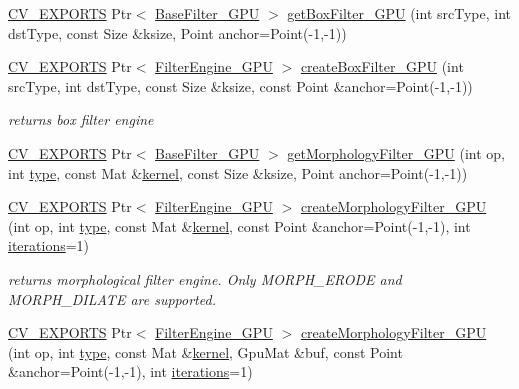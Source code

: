 \begin{DoxyCompactItemize}
\item 
\hyperlink{core_2types__c_8h_a1bf9f0e121b54272da02379cfccd0a2b}{C\-V\-\_\-\-E\-X\-P\-O\-R\-T\-S} Ptr$<$ \hyperlink{classcv_1_1gpu_1_1BaseFilter__GPU}{Base\-Filter\-\_\-\-G\-P\-U} $>$ \hyperlink{namespacecv_1_1gpu_a5dd82b8d8e9ff9dc81f109235651e16c}{get\-Box\-Filter\-\_\-\-G\-P\-U} (int src\-Type, int dst\-Type, const Size \&ksize, Point anchor=Point(-\/1,-\/1))
\item 
\hyperlink{core_2types__c_8h_a1bf9f0e121b54272da02379cfccd0a2b}{C\-V\-\_\-\-E\-X\-P\-O\-R\-T\-S} Ptr$<$ \hyperlink{classcv_1_1gpu_1_1FilterEngine__GPU}{Filter\-Engine\-\_\-\-G\-P\-U} $>$ \hyperlink{namespacecv_1_1gpu_a581d4a246334ad155cdb05b72d004365}{create\-Box\-Filter\-\_\-\-G\-P\-U} (int src\-Type, int dst\-Type, const Size \&ksize, const Point \&anchor=Point(-\/1,-\/1))
\begin{DoxyCompactList}\small\item\em returns box filter engine \end{DoxyCompactList}\item 
\hyperlink{core_2types__c_8h_a1bf9f0e121b54272da02379cfccd0a2b}{C\-V\-\_\-\-E\-X\-P\-O\-R\-T\-S} Ptr$<$ \hyperlink{classcv_1_1gpu_1_1BaseFilter__GPU}{Base\-Filter\-\_\-\-G\-P\-U} $>$ \hyperlink{namespacecv_1_1gpu_a61eac858fc4db7e2bb7adc16339e75a6}{get\-Morphology\-Filter\-\_\-\-G\-P\-U} (int op, int \hyperlink{imgproc__c_8h_a84612d8738bf935200cf32a103d8efe1}{type}, const Mat \&\hyperlink{imgproc__c_8h_a863a75780ba6c5de552f5361cb0d2c89}{kernel}, const Size \&ksize, Point anchor=Point(-\/1,-\/1))
\item 
\hyperlink{core_2types__c_8h_a1bf9f0e121b54272da02379cfccd0a2b}{C\-V\-\_\-\-E\-X\-P\-O\-R\-T\-S} Ptr$<$ \hyperlink{classcv_1_1gpu_1_1FilterEngine__GPU}{Filter\-Engine\-\_\-\-G\-P\-U} $>$ \hyperlink{namespacecv_1_1gpu_ae88103a59ce45048d8da0a7957225030}{create\-Morphology\-Filter\-\_\-\-G\-P\-U} (int op, int \hyperlink{imgproc__c_8h_a84612d8738bf935200cf32a103d8efe1}{type}, const Mat \&\hyperlink{imgproc__c_8h_a863a75780ba6c5de552f5361cb0d2c89}{kernel}, const Point \&anchor=Point(-\/1,-\/1), int \hyperlink{tracking_8hpp_a17372ac3c8ba01bc6cfc265b2824992e}{iterations}=1)
\begin{DoxyCompactList}\small\item\em returns morphological filter engine. Only M\-O\-R\-P\-H\-\_\-\-E\-R\-O\-D\-E and M\-O\-R\-P\-H\-\_\-\-D\-I\-L\-A\-T\-E are supported. \end{DoxyCompactList}\item 
\hyperlink{core_2types__c_8h_a1bf9f0e121b54272da02379cfccd0a2b}{C\-V\-\_\-\-E\-X\-P\-O\-R\-T\-S} Ptr$<$ \hyperlink{classcv_1_1gpu_1_1FilterEngine__GPU}{Filter\-Engine\-\_\-\-G\-P\-U} $>$ \hyperlink{namespacecv_1_1gpu_a20a67725a7765c002c47719af2f0ed47}{create\-Morphology\-Filter\-\_\-\-G\-P\-U} (int op, int \hyperlink{imgproc__c_8h_a84612d8738bf935200cf32a103d8efe1}{type}, const Mat \&\hyperlink{imgproc__c_8h_a863a75780ba6c5de552f5361cb0d2c89}{kernel}, Gpu\-Mat \&buf, const Point \&anchor=Point(-\/1,-\/1), int \hyperlink{tracking_8hpp_a17372ac3c8ba01bc6cfc265b2824992e}{iterations}=1)

\end{DoxyCompactItemize}
